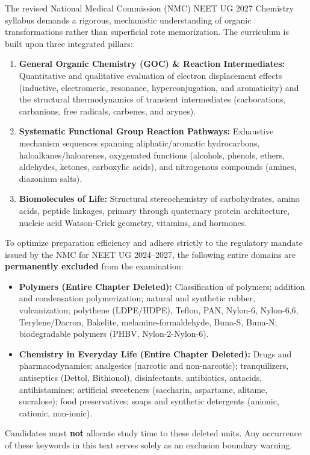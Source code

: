\documentclass[10pt,twoside,openright]{book}
\begin{document}
\begin{conceptbox}
The revised National Medical Commission (NMC) NEET UG 2027 Chemistry syllabus demands a rigorous, mechanistic understanding of organic transformations rather than superficial rote memorization. The curriculum is built upon three integrated pillars:
\begin{enumerate}[leftmargin=*]
  \item \textbf{General Organic Chemistry (GOC) \& Reaction Intermediates:} Quantitative and qualitative evaluation of electron displacement effects (inductive, electromeric, resonance, hyperconjugation, and aromaticity) and the structural thermodynamics of transient intermediates (carbocations, carbanions, free radicals, carbenes, and arynes).
  \item \textbf{Systematic Functional Group Reaction Pathways:} Exhaustive mechanism sequences spanning aliphatic/aromatic hydrocarbons, haloalkanes/haloarenes, oxygenated functions (alcohols, phenols, ethers, aldehydes, ketones, carboxylic acids), and nitrogenous compounds (amines, diazonium salts).
  \item \textbf{Biomolecules of Life:} Structural stereochemistry of carbohydrates, amino acids, peptide linkages, primary through quaternary protein architecture, nucleic acid Watson-Crick geometry, vitamins, and hormones.
\end{enumerate}
\end{conceptbox}

\begin{trapbox}
To optimize preparation efficiency and adhere strictly to the regulatory mandate issued by the NMC for NEET UG 2024--2027, the following entire domains are \textbf{permanently excluded} from the examination:
\begin{itemize}
  \item \textbf{Polymers (Entire Chapter Deleted):} Classification of polymers; addition and condensation polymerization; natural and synthetic rubber, vulcanization; polythene (LDPE/HDPE), Teflon, PAN, Nylon-6, Nylon-6,6, Terylene/Dacron, Bakelite, melamine-formaldehyde, Buna-S, Buna-N; biodegradable polymers (PHBV, Nylon-2-Nylon-6).
  \item \textbf{Chemistry in Everyday Life (Entire Chapter Deleted):} Drugs and pharmacodynamics; analgesics (narcotic and non-narcotic); tranquilizers, antiseptics (Dettol, Bithionol), disinfectants, antibiotics, antacids, antihistamines; artificial sweeteners (saccharin, aspartame, alitame, sucralose); food preservatives; soaps and synthetic detergents (anionic, cationic, non-ionic).
\end{itemize}
Candidates must \textbf{not} allocate study time to these deleted units. Any occurrence of these keywords in this text serves solely as an exclusion boundary warning.
\end{trapbox}
\end{document}
